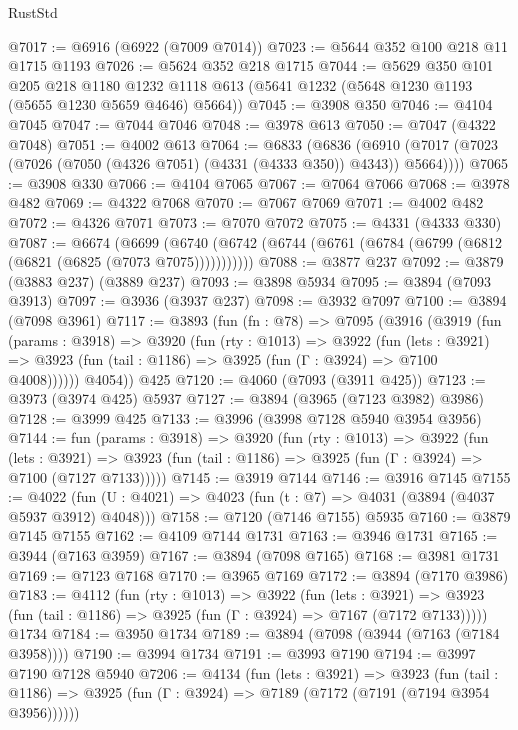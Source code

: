 \begin{lexlean}{RustStd}
\begin{coremodule}
@7017 := @6916 (@6922 (@7009 @7014))
@7023 := @5644 @352 @100 @218 @11 @1715 @1193
@7026 := @5624 @352 @218 @1715
@7044 := @5629
    @350
    @101
    @205
    @218
    @1180
    @1232
    @1118
    @613
    (@5641 @1232 (@5648 @1230 @1193 (@5655 @1230 @5659 @4646) @5664))
@7045 := @3908 @350
@7046 := @4104 @7045
@7047 := @7044 @7046
@7048 := @3978 @613
@7050 := @7047 (@4322 @7048)
@7051 := @4002 @613
@7064 := @6833
    (@6836 (@6910 (@7017 (@7023 (@7026 (@7050 (@4326 @7051) (@4331 (@4333 @350)) @4343)) @5664))))
@7065 := @3908 @330
@7066 := @4104 @7065
@7067 := @7064 @7066
@7068 := @3978 @482
@7069 := @4322 @7068
@7070 := @7067 @7069
@7071 := @4002 @482
@7072 := @4326 @7071
@7073 := @7070 @7072
@7075 := @4331 (@4333 @330)
@7087 := @6674
    (@6699 (@6740 (@6742 (@6744 (@6761 (@6784 (@6799 (@6812 (@6821 (@6825 (@7073 @7075)))))))))))
@7088 := @3877 @237
@7092 := @3879 (@3883 @237) (@3889 @237)
@7093 := @3898 @5934
@7095 := @3894 (@7093 @3913)
@7097 := @3936 (@3937 @237)
@7098 := @3932 @7097
@7100 := @3894 (@7098 @3961)
@7117 := @3893
    (fun (fn : @78) =>
    @7095
      (@3916
        (@3919
          (fun (params : @3918) =>
          @3920
            (fun (rty : @1013) =>
            @3922
              (fun (lets : @3921) =>
              @3923 (fun (tail : @1186) => @3925 (fun (Γ : @3924) => @7100 @4008))))))
        @4054))
    @425
@7120 := @4060 (@7093 (@3911 @425))
@7123 := @3973 (@3974 @425) @5937
@7127 := @3894 (@3965 (@7123 @3982) @3986)
@7128 := @3999 @425
@7133 := @3996 (@3998 @7128 @5940 @3954 @3956)
@7144 := fun (params : @3918) =>
  @3920
    (fun (rty : @1013) =>
    @3922
      (fun (lets : @3921) =>
      @3923 (fun (tail : @1186) => @3925 (fun (Γ : @3924) => @7100 (@7127 @7133)))))
@7145 := @3919 @7144
@7146 := @3916 @7145
@7155 := @4022 (fun (U : @4021) => @4023 (fun (t : @7) => @4031 (@3894 (@4037 @5937 @3912) @4048)))
@7158 := @7120 (@7146 @7155) @5935
@7160 := @3879 @7145 @7155
@7162 := @4109 @7144 @1731
@7163 := @3946 @1731
@7165 := @3944 (@7163 @3959)
@7167 := @3894 (@7098 @7165)
@7168 := @3981 @1731
@7169 := @7123 @7168
@7170 := @3965 @7169
@7172 := @3894 (@7170 @3986)
@7183 := @4112
    (fun (rty : @1013) =>
    @3922
      (fun (lets : @3921) =>
      @3923 (fun (tail : @1186) => @3925 (fun (Γ : @3924) => @7167 (@7172 @7133)))))
    @1734
@7184 := @3950 @1734
@7189 := @3894 (@7098 (@3944 (@7163 (@7184 @3958))))
@7190 := @3994 @1734
@7191 := @3993 @7190
@7194 := @3997 @7190 @7128 @5940
@7206 := @4134
    (fun (lets : @3921) =>
    @3923
      (fun (tail : @1186) => @3925 (fun (Γ : @3924) => @7189 (@7172 (@7191 (@7194 @3954 @3956))))))

\end{coremodule}
\end{lexlean}
